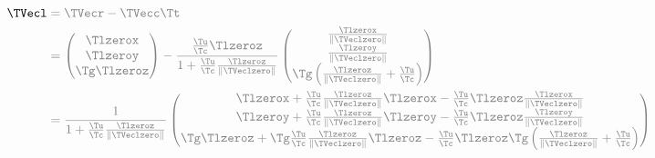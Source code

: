 \begin{derivation}
	\begin{equation}
		\begin{aligned}
			\TVecl
			 & \color{gray} = \TVecr  - \TVecc  \Tt
			\\
			 & \color{gray} =
			\begin{pmatrix}
				\Tlzerox           \\
				\Tlzeroy           \\
				{\Tg } \Tlzeroz  \\
			\end{pmatrix}
			-
			\frac{\frac{\Tu }{\Tc } {\Tlzeroz  } }{1 + \frac{\Tu }{\Tc } \frac{\Tlzeroz  }{\|\TVeclzero \|} }
			\begin{pmatrix}
				\frac{\Tlzerox  }{\|\TVeclzero \|}                                      \\
				\frac{\Tlzeroy  }{\|\TVeclzero \|}                                      \\
				\Tg  \left( \frac{\Tlzeroz  }{\|\TVeclzero \|} + \frac{\Tu }{\Tc }  \right) \\
			\end{pmatrix} \\
			 & \color{gray} =
			\frac{1}{1 + \frac{\Tu }{\Tc } \frac{\Tlzeroz  }{\|\TVeclzero \|} }
			\begin{pmatrix}
				\Tlzerox  + \frac{\Tu }{\Tc } \frac{\Tlzeroz  }{\|\TVeclzero \|} \Tlzerox  - \frac{\Tu }{\Tc } {\Tlzeroz  } \frac{\Tlzerox  }{\|\TVeclzero \|}                                                         \\
				\Tlzeroy  + \frac{\Tu }{\Tc } \frac{\Tlzeroz  }{\|\TVeclzero \|} \Tlzeroy  - \frac{\Tu }{\Tc } {\Tlzeroz  } \frac{\Tlzeroy  }{\|\TVeclzero \|}                                                         \\
				{\Tg } \Tlzeroz  + \Tg  \frac{\Tu }{\Tc } \frac{\Tlzeroz  }{\|\TVeclzero \|} \Tlzeroz  - \frac{\Tu }{\Tc } {\Tlzeroz  }  \Tg  \left( \frac{\Tlzeroz  }{\|\TVeclzero \|} + \frac{\Tu }{\Tc }  \right) \\
			\end{pmatrix}
		\end{aligned}
	\end{equation}


\end{derivation}
